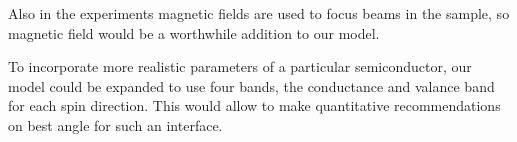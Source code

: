 Also in the experiments  magnetic fields are used to focus beams in the
sample, so magnetic field would be a worthwhile addition to our model.

To incorporate more realistic parameters of a particular semiconductor, 
our model could be expanded to use four bands,
the conductance and valance band for each spin direction. This would allow to
make quantitative recommendations on best angle for such an interface.


